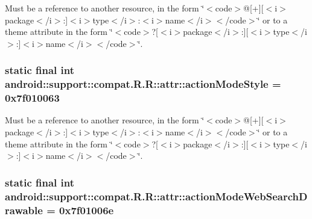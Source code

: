 Must be a reference to another resource, in the form \char`\"{}$<$code$>$@\mbox{[}+\mbox{]}\mbox{[}$<$i$>$package$<$/i$>$:\mbox{]}$<$i$>$type$<$/i$>$:$<$i$>$name$<$/i$>$$<$/code$>$\char`\"{} or to a theme attribute in the form \char`\"{}$<$code$>$?\mbox{[}$<$i$>$package$<$/i$>$:\mbox{]}\mbox{[}$<$i$>$type$<$/i$>$:\mbox{]}$<$i$>$name$<$/i$>$$<$/code$>$\char`\"{}. \hypertarget{classandroid_1_1support_1_1compat_1_1_r_1_1attr_1cff76e8e544c89f4516e9479591ec3c}{
\subsubsection[{actionModeStyle}]{\setlength{\rightskip}{0pt plus 5cm}static final int android::support::compat.R.R::attr::actionModeStyle = 0x7f010063}}
\label{classandroid_1_1support_1_1compat_1_1_r_1_1attr_1cff76e8e544c89f4516e9479591ec3c}


Must be a reference to another resource, in the form \char`\"{}$<$code$>$@\mbox{[}+\mbox{]}\mbox{[}$<$i$>$package$<$/i$>$:\mbox{]}$<$i$>$type$<$/i$>$:$<$i$>$name$<$/i$>$$<$/code$>$\char`\"{} or to a theme attribute in the form \char`\"{}$<$code$>$?\mbox{[}$<$i$>$package$<$/i$>$:\mbox{]}\mbox{[}$<$i$>$type$<$/i$>$:\mbox{]}$<$i$>$name$<$/i$>$$<$/code$>$\char`\"{}. \hypertarget{classandroid_1_1support_1_1compat_1_1_r_1_1attr_040fc6abdb258c6945e91acefd75e7b6}{
\subsubsection[{actionModeWebSearchDrawable}]{\setlength{\rightskip}{0pt plus 5cm}static final int android::support::compat.R.R::attr::actionModeWebSearchDrawable = 0x7f01006e}}
\label{classandroid_1_1support_1_1compat_1_1_r_1_1attr_040fc6abdb258c6945e91acefd75e7b6}


